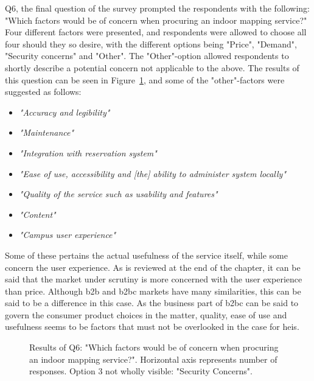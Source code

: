 Q6, the final question of the survey prompted the respondents with the following: "Which factors would be of concern when procuring an indoor mapping service?" Four different factors were presented, and respondents were allowed to choose all four should they so desire, with the different options being "Price", "Demand", "Security concerns" and "Other". The "Other"-option allowed respondents to shortly describe a potential concern not applicable to the above. The results of this question can be seen in Figure~\ref{fig:q6}, and some of the "other"-factors were suggested as follows:
\begin{itemize}
    \item \textit{"Accuracy and legibility"}
    \item \textit{"Maintenance"}
    \item \textit{"Integration with reservation system"}
    \item \textit{"Ease of use, accessibility and [the] ability to administer system locally"}
    \item \textit{"Quality of the service such as usability and features"}
    \item \textit{"Content"}
    \item \textit{"Campus user experience"}
\end{itemize}

Some of these pertains the actual usefulness of the service itself, while some concern the user experience. As is reviewed at the end of the chapter, it can be said that the market under scrutiny is more concerned with the user experience than price. Although \gls{b2b} and \gls{b2bc} markets have many similarities, this can be said to be a difference in this case. As the business part of \gls{b2bc} can be said to govern the consumer product choices in the matter, quality, ease of use and usefulness seems to be factors that must not be overlooked in the case for \glspl{hei}.



\begin{figure}[H]
    \centering
    \caption{Results of Q6: "Which factors would be of concern when procuring an indoor mapping service?". Horizontal axis represents number of responses. Option 3 not wholly visible: "Security Concerns".}
    \label{fig:q6}
\end{figure}

